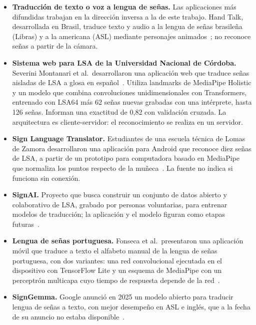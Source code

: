 \begin{itemize}
    \item \textbf{Traducción de texto o voz a lengua de señas.} Las aplicaciones más difundidas trabajan en la dirección inversa a la de este trabajo. Hand Talk, desarrollada en Brasil, traduce texto y audio a la lengua de señas brasileña (Libras) y a la americana (ASL) mediante personajes animados~\cite{handtalk}; no reconoce señas a partir de la cámara.
    \item \textbf{Sistema web para LSA de la Universidad Nacional de Córdoba.} Severini Montanari et al.\ desarrollaron una aplicación web que traduce señas aisladas de LSA a glosa en español~\cite{severini2025lsaweb}. Utiliza landmarks de MediaPipe Holistic y un modelo que combina convoluciones unidimensionales con Transformers, entrenado con LSA64 más 62 señas nuevas grabadas con una intérprete, hasta 126 señas. Informan una exactitud de 0,82 con validación cruzada. La arquitectura es cliente-servidor: el reconocimiento se realiza en un servidor.
    \item \textbf{Sign Language Translator.} Estudiantes de una escuela técnica de Lomas de Zamora desarrollaron una aplicación para Android que reconoce diez señas de LSA, a partir de un prototipo para computadora basado en MediaPipe que normaliza los puntos respecto de la muñeca~\cite{infobae2026slt}. La fuente no indica si funciona sin conexión.
    \item \textbf{SignAI.} Proyecto que busca construir un conjunto de datos abierto y colaborativo de LSA, grabado por personas voluntarias, para entrenar modelos de traducción; la aplicación y el modelo figuran como etapas futuras~\cite{signai}.
    \item \textbf{Lengua de señas portuguesa.} Fonseca et al.\ presentaron una aplicación móvil que traduce a texto el alfabeto manual de la lengua de señas portuguesa, con dos variantes: una red convolucional ejecutada en el dispositivo con TensorFlow Lite y un esquema de MediaPipe con un perceptrón multicapa cuyo tiempo de respuesta depende de la red~\cite{fonseca2025lgp}.
    \item \textbf{SignGemma.} Google anunció en 2025 un modelo abierto para traducir lengua de señas a texto, con mejor desempeño en ASL e inglés, que a la fecha de su anuncio no estaba disponible~\cite{techcrunch2025signgemma}.
\end{itemize}

